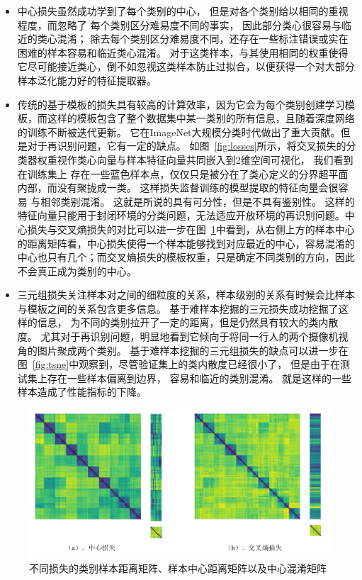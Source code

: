 \begin{itemize}
	\item 中心损失虽然成功学到了每个类别的中心，
	但是对各个类别给以相同的重视程度，而忽略了
	每个类别区分难易度不同的事实，
	因此部分类心很容易与临近的类心混淆；
	除去每个类别区分难易度不同，还存在一些标注错误或实在困难的样本容易和临近类心混淆。
	对于这类样本，与其使用相同的权重使得它尽可能接近类心，倒不如忽视这类样本防止过拟合，以便获得一个对大部分样本泛化能力好的特征提取器。
	\item 传统的基于模板的损失具有较高的计算效率，因为它会为每个类别创建学习模板，而这样的模板包含了整个数据集中某一类别的所有信息，且随着深度网络的训练不断被迭代更新。
	它在ImageNet大规模分类时代做出了重大贡献。但是对于再识别问题，它有一定的缺点。
	如图~\ref{fig:losses}所示，将交叉损失的分类器权重视作类心向量与样本特征向量共同嵌入到2维空间可视化，
	我们看到在训练集上
	存在一些蓝色样本点，仅仅只是被分在了类心定义的分界超平面内部，而没有聚拢成一类。
	这样损失监督训练的模型提取的特征向量会很容易
	与相邻类别混淆。
	这就是所说的具有可分性，但是不具有鉴别性。
	这样的特征向量只能用于封闭环境的分类问题，无法适应开放环境的再识别问题。中心损失与交叉熵损失的对比可以进一步在图~\ref{fig:distmat-all}中看到，从右侧上方的样本中心的距离矩阵看，中心损失使得一个样本能够找到对应最近的中心，容易混淆的中心也只有几个；而交叉熵损失的模板权重，只是确定不同类别的方向，因此不会真正成为类别的中心。
	\item 三元组损失关注样本对之间的细粒度的关系，样本级别的关系有时候会比样本与模板之间的关系包含更多信息。
	基于难样本挖掘的三元损失成功挖掘了这样的信息，
	为不同的类别拉开了一定的距离，但是仍然具有较大的类内散度。
	尤其对于再识别问题，明显地看到它倾向于将同一行人的两个摄像机视角的图片聚成两个类别。 
	基于难样本挖掘的三元组损失的缺点可以进一步在图~\ref{fig:tsne}中观察到，尽管验证集上的类内散度已经很小了，
	但是由于在测试集上存在一些样本偏离到边界，
	容易和临近的类别混淆。
	就是这样的一些样本造成了性能指标的下降。
\end{itemize}

\begin{figure}
	\centering 
	\includegraphics[width=\textwidth]{fig/2018-05-20-14-43-35.png}
	\caption{不同损失的类别样本距离矩阵、样本中心距离矩阵以及中心混淆矩阵} \label{fig:distmat-all}
\end{figure}

